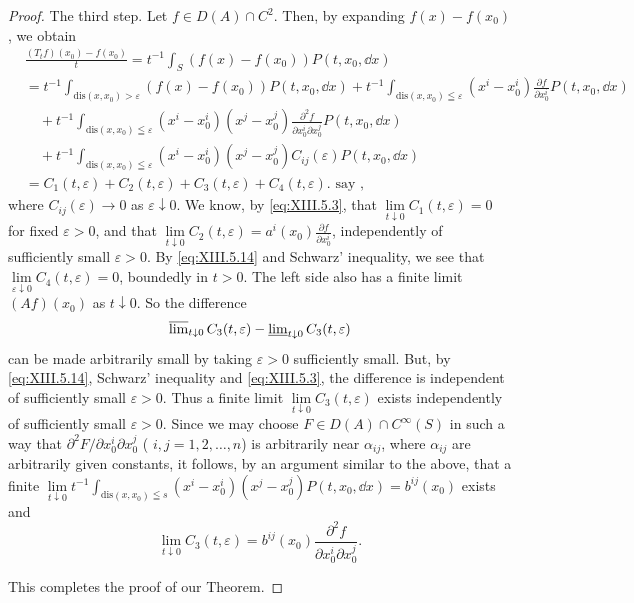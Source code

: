 \begin{proof}
The third step. Let $f \in D(A) \cap C^2$. Then, by expanding $f(x) - f(x_0)$, we obtain 
\begin{equation}\label{eq:XIII.5.15}
\begin{aligned}
&\frac {(T _{t} f) (x _{0}) - f (x _{0})}{t} = t ^{-1} \int_{S} (f (x) - f (x _{0})) P (t, x _{0}, \dd x)
\\
&= t ^{-1} \int_ {\mathrm{dis} (x, x _{0}) > \varepsilon} (f (x) - f (x _{0})) P (t, x _{0}, \dd x) + t ^{-1} \int_ {\mathrm{dis} (x, x _{0}) \leqq \varepsilon} (x ^{i} - x _{0} ^{i}) \frac {\partial f}{\partial x _{0} ^{i}} P (t, x _{0}, \dd x)
\\
&\quad + t ^{-1} \int_ {\mathrm{dis} (x, x _{0}) \leqq \varepsilon} (x ^{i} - x _{0} ^{i}) (x ^{j} - x _{0} ^{j}) \frac {\partial^{2} f}{\partial x _{0} ^{i} \partial x _{0} ^{j}} P (t, x _{0}, \dd x)
\\
&\quad + t ^{-1} \int_ {\mathrm{dis} (x, x _{0}) \leqq \varepsilon} (x ^{i} - x _{0} ^{i}) (x ^{j} - x _{0} ^{j}) C _{ij} (\varepsilon) P (t, x _{0}, \dd x)
\\
&= C _{1} (t, \varepsilon) + C _{2} (t, \varepsilon) + C _{3} (t, \varepsilon) + C _{4} (t, \varepsilon). \text{ say },
\end{aligned}
\end{equation}
where $C_{ij}(\varepsilon) \to 0$ as $\varepsilon \downarrow 0$. We know, by \eqref{eq:XIII.5.3}, that $\lim\limits_{t \downarrow 0} C_1(t, \varepsilon) = 0$ for fixed $\varepsilon > 0$, and that $\lim\limits_{t \downarrow 0} C_2(t, \varepsilon) = a^i(x_0) \frac{\partial f}{\partial x_0^i}$, independently of sufficiently small $\varepsilon > 0$. By \eqref{eq:XIII.5.14} and Schwarz' inequality, we see that $\lim\limits_{\varepsilon \downarrow 0} C_4(t, \varepsilon) = 0$, boundedly in $t > 0$. The left side also has a finite limit $(Af)(x_0)$ as $t \downarrow 0$. So the difference 
\[
\varlimsup\limits_{t \downarrow 0} C _{3} (t, \varepsilon) - \varliminf\limits_{t \downarrow 0} C _{3} (t, \varepsilon)
\]
can be made arbitrarily small by taking $\varepsilon > 0$ sufficiently small. But, by \eqref{eq:XIII.5.14}, Schwarz' inequality and \eqref{eq:XIII.5.3}, the difference is independent of sufficiently small $\varepsilon > 0$. Thus a finite limit $\lim\limits_{t \downarrow 0} C_3(t, \varepsilon)$ exists independently of sufficiently small $\varepsilon > 0$. Since we may choose $F \in D(A) \cap C^\infty(S)$ in such a way that $\partial^2 F / \partial x_0^i \partial x_0^j$ ( $i, j = 1, 2, \ldots, n$) is arbitrarily near $\alpha_{ij}$, where $\alpha_{ij}$ are arbitrarily given constants, it follows, by an argument similar to the above, that 
a finite $\lim\limits_{t\downarrow 0}t^{-1}\int_{\mathrm{dis}(x,x_0)\leqq s}(x^i -x_0^i)(x^j -x_0^j)P(t,x_0,\dd x) = b^{ij}(x_0)$ exists and 
\begin{equation}\label{eq:XIII.5.16}
\lim\limits _{t \downarrow 0} C _{3} (t, \varepsilon) = b ^{ij} \left(x _{0}\right) \frac {\partial^{2} f}{\partial x _{0} ^{i} \partial x _{0} ^{j}}.
\end{equation}

This completes the proof of our Theorem.
\end{proof}

